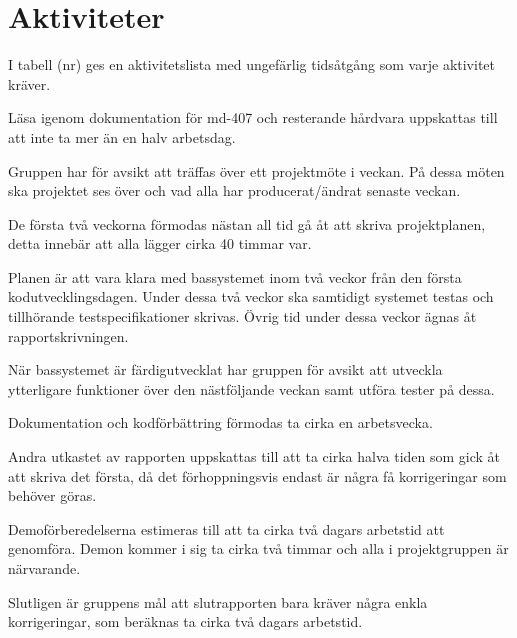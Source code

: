 \documentclass[a4paper]{article}
\begin{document}
\section{Aktiviteter}
I tabell (nr) ges en aktivitetslista med ungefärlig tidsåtgång som varje aktivitet kräver.

Läsa igenom dokumentation för md-407 och resterande hårdvara uppskattas till att inte ta mer än en halv arbetsdag.

Gruppen har för avsikt att träffas över ett projektmöte i veckan. På dessa möten ska projektet ses över och vad alla har producerat/ändrat senaste veckan.

De första två veckorna förmodas nästan all tid gå åt att skriva projektplanen, detta innebär att alla lägger cirka 40 timmar var.

Planen är att vara klara med bassystemet inom två veckor från den första kodutvecklingsdagen. Under dessa två veckor ska samtidigt systemet testas och tillhörande testspecifikationer skrivas. Övrig tid under dessa veckor ägnas åt rapportskrivningen.

När bassystemet är färdigutvecklat har gruppen för avsikt att utveckla \\ytterligare funktioner över den nästföljande veckan samt utföra tester på dessa.

Dokumentation och kodförbättring förmodas ta cirka en arbetsvecka.

Andra utkastet av rapporten uppskattas till att ta cirka halva tiden som gick åt att skriva det första, då det förhoppningsvis endast är några få korrigeringar som behöver göras.

Demoförberedelserna estimeras till att ta cirka två dagars arbetstid att \\genomföra. Demon kommer i sig ta cirka två timmar och alla i projektgruppen är närvarande.

Slutligen är gruppens mål att slutrapporten bara kräver några enkla\\ korrigeringar, som beräknas ta cirka två dagars arbetstid.
\end{document}
